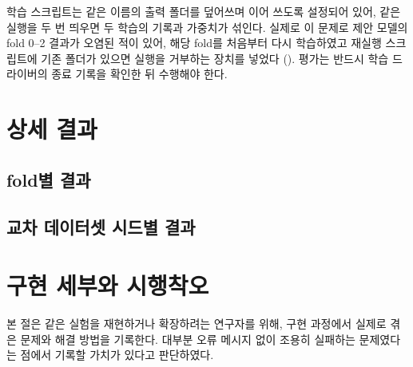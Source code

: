 학습 스크립트는 같은 이름의 출력 폴더를 덮어쓰며 이어 쓰도록 설정되어 있어, 같은 실행을 두 번 띄우면
두 학습의 기록과 가중치가 섞인다. 실제로 이 문제로 제안 모델의 fold 0--2 결과가 오염된 적이 있어, 해당 fold를
처음부터 다시 학습하였고 재실행 스크립트에 기존 폴더가 있으면 실행을 거부하는 장치를 넣었다
(). 평가는 반드시 학습 드라이버의 종료 기록을 확인한 뒤 수행해야 한다.

\chapter{상세 결과}\label{app:detail}

\section{fold별 결과}



\section{교차 데이터셋 시드별 결과}


\chapter{구현 세부와 시행착오}\label{app:impl}

본 절은 같은 실험을 재현하거나 확장하려는 연구자를 위해, 구현 과정에서 실제로 겪은 문제와 해결 방법을
기록한다. 대부분 오류 메시지 없이 조용히 실패하는 문제였다는 점에서 기록할 가치가 있다고 판단하였다.

